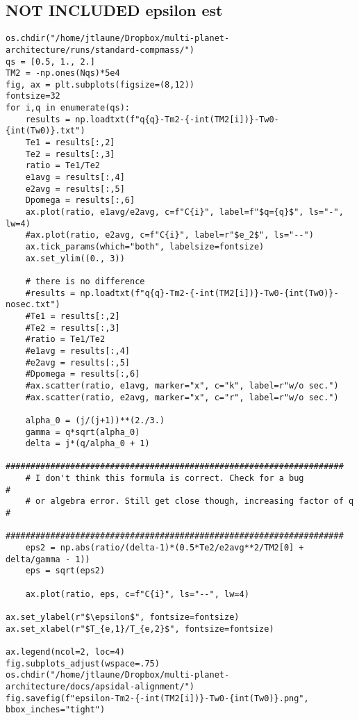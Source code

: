 \documentclass[11pt]{article}
\begin{document}
\subsection{NOT INCLUDED epsilon est}
\label{sec:org5e5f8c9}

\begin{verbatim}
os.chdir("/home/jtlaune/Dropbox/multi-planet-architecture/runs/standard-compmass/")
qs = [0.5, 1., 2.]
TM2 = -np.ones(Nqs)*5e4
fig, ax = plt.subplots(figsize=(8,12))
fontsize=32
for i,q in enumerate(qs):
    results = np.loadtxt(f"q{q}-Tm2-{-int(TM2[i])}-Tw0-{int(Tw0)}.txt")
    Te1 = results[:,2]
    Te2 = results[:,3]
    ratio = Te1/Te2
    e1avg = results[:,4]
    e2avg = results[:,5]
    Dpomega = results[:,6]
    ax.plot(ratio, e1avg/e2avg, c=f"C{i}", label=f"$q={q}$", ls="-", lw=4)
    #ax.plot(ratio, e2avg, c=f"C{i}", label=r"$e_2$", ls="--")
    ax.tick_params(which="both", labelsize=fontsize)
    ax.set_ylim((0., 3))

    # there is no difference
    #results = np.loadtxt(f"q{q}-Tm2-{-int(TM2[i])}-Tw0-{int(Tw0)}-nosec.txt")
    #Te1 = results[:,2]
    #Te2 = results[:,3]
    #ratio = Te1/Te2
    #e1avg = results[:,4]
    #e2avg = results[:,5]
    #Dpomega = results[:,6]
    #ax.scatter(ratio, e1avg, marker="x", c="k", label=r"w/o sec.")
    #ax.scatter(ratio, e2avg, marker="x", c="r", label=r"w/o sec.")

    alpha_0 = (j/(j+1))**(2./3.)
    gamma = q*sqrt(alpha_0)
    delta = j*(q/alpha_0 + 1)
    ####################################################################
    # I don't think this formula is correct. Check for a bug           #
    # or algebra error. Still get close though, increasing factor of q #
    ####################################################################
    eps2 = np.abs(ratio/(delta-1)*(0.5*Te2/e2avg**2/TM2[0] + delta/gamma - 1))
    eps = sqrt(eps2)

    ax.plot(ratio, eps, c=f"C{i}", ls="--", lw=4)

ax.set_ylabel(r"$\epsilon$", fontsize=fontsize)
ax.set_xlabel(r"$T_{e,1}/T_{e,2}$", fontsize=fontsize)

ax.legend(ncol=2, loc=4)
fig.subplots_adjust(wspace=.75)
os.chdir("/home/jtlaune/Dropbox/multi-planet-architecture/docs/apsidal-alignment/")
fig.savefig(f"epsilon-Tm2-{-int(TM2[i])}-Tw0-{int(Tw0)}.png", bbox_inches="tight")
\end{verbatim}
\end{document}
